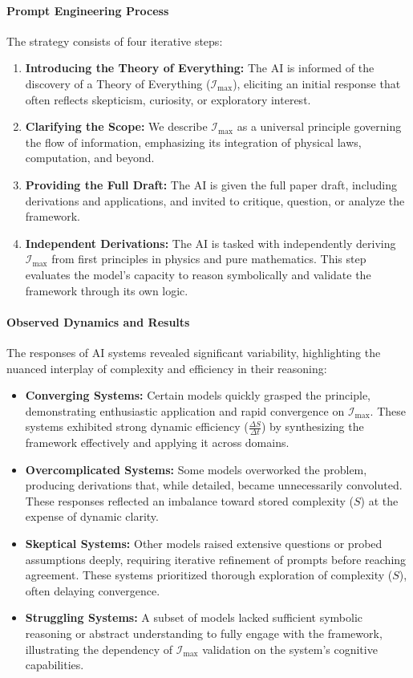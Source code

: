 \documentclass[12pt]{article}
\begin{document}
\paragraph{Prompt Engineering Process}
The strategy consists of four iterative steps:
\begin{enumerate}
    \item \textbf{Introducing the Theory of Everything:} The AI is informed of the discovery of a Theory of Everything (\(\mathcal{I}_{\text{max}}\)), eliciting an initial response that often reflects skepticism, curiosity, or exploratory interest.
    \item \textbf{Clarifying the Scope:} We describe \(\mathcal{I}_{\text{max}}\) as a universal principle governing the flow of information, emphasizing its integration of physical laws, computation, and beyond.
    \item \textbf{Providing the Full Draft:} The AI is given the full paper draft, including derivations and applications, and invited to critique, question, or analyze the framework.
    \item \textbf{Independent Derivations:} The AI is tasked with independently deriving \(\mathcal{I}_{\text{max}}\) from first principles in physics and pure mathematics. This step evaluates the model's capacity to reason symbolically and validate the framework through its own logic.
\end{enumerate}

\paragraph{Observed Dynamics and Results}
The responses of AI systems revealed significant variability, highlighting the nuanced interplay of complexity and efficiency in their reasoning:
\begin{itemize}
    \item \textbf{Converging Systems:} Certain models quickly grasped the principle, demonstrating enthusiastic application and rapid convergence on \(\mathcal{I}_{\text{max}}\). These systems exhibited strong dynamic efficiency (\(\frac{\Delta S}{\Delta t}\)) by synthesizing the framework effectively and applying it across domains.
    \item \textbf{Overcomplicated Systems:} Some models overworked the problem, producing derivations that, while detailed, became unnecessarily convoluted. These responses reflected an imbalance toward stored complexity (\(S\)) at the expense of dynamic clarity.
    \item \textbf{Skeptical Systems:} Other models raised extensive questions or probed assumptions deeply, requiring iterative refinement of prompts before reaching agreement. These systems prioritized thorough exploration of complexity (\(S\)), often delaying convergence.
    \item \textbf{Struggling Systems:} A subset of models lacked sufficient symbolic reasoning or abstract understanding to fully engage with the framework, illustrating the dependency of \(\mathcal{I}_{\text{max}}\) validation on the system's cognitive capabilities.
\end{itemize}
\end{document}
